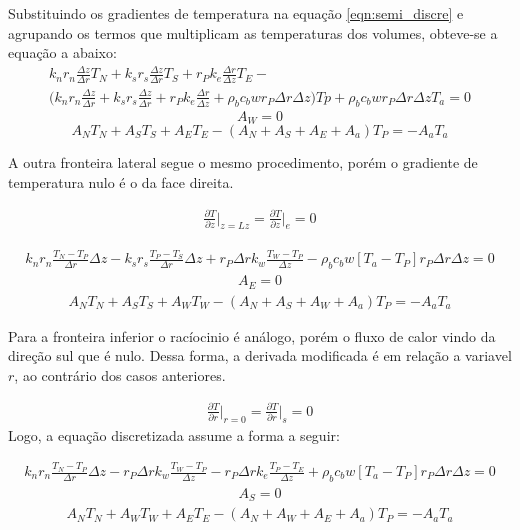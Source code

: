 \documentclass[
	12pt,				%
	openright,			%
	oneside,			%
	a4paper,			%
	english,			%
	french,				%
	spanish,			%
	brazil				%
	]{abntex2}
\begin{document}
Substituindo os gradientes de temperatura na equação \ref{eqn:semi_discre} e agrupando os termos que multiplicam as temperaturas dos volumes, obteve-se a equação a abaixo:
\begin{gather}
k_n r_n \frac{\Delta z}{\Delta r}T_N +
k_s r_s \frac{\Delta z}{\Delta r}T_S +
r_P k_e \frac{\Delta r}{\Delta z}T_E -
\\
\biggr( 
k_n r_n \frac{\Delta z}{\Delta r} +
k_s r_s \frac{\Delta z}{\Delta r} +
r_P k_e \frac{\Delta r}{\Delta z} + 
\rho_b c_b wr_P \Delta r\Delta z
\biggr)Tp +
\rho_b c_b wr_P \Delta r\Delta z T_a = 
0
\end{gather}
\begin{equation}
A_W=0
\end{equation}
\begin{equation}
A_N T_N+A_S T_S+A_E T_E-(A_N+A_S+A_E+A_a)T_P=-A_a T_a
\end{equation}

A outra fronteira lateral segue o mesmo procedimento, porém o gradiente de temperatura nulo é o da face direita. 

\begin{gather}     
\frac{\partial T}{\partial z}\biggr\rvert_{z=Lz}=
\frac{\partial T}{\partial z}\biggr\rvert_{e}=0
\end{gather}

\begin{gather}                                           
k_n r_n \frac{T_N-T_P}{\Delta r}\Delta z -
k_s r_s  \frac{T_P-T_S}{\Delta r}\Delta z +
r_P \Delta r k_w \frac{T_W-T_P}{\Delta z} -
\rho_b c_b w [T_a-T_P]r_P \Delta r\Delta z = 0
\end{gather}
\begin{gather}
A_E=0
\end{gather}
\begin{gather}
A_N T_N+A_S T_S+A_W T_W-(A_N+A_S+A_W+A_a)T_P=-A_a T_a
\end{gather} 

Para a fronteira inferior o racíocinio é análogo, porém o fluxo de calor vindo da direção sul que é nulo. Dessa forma, a derivada modificada é em relação a variavel $r$, ao contrário dos casos anteriores. 

\begin{gather}     
\frac{\partial T}{\partial r}\biggr\rvert_{r=0}=
\frac{\partial T}{\partial r}\biggr\rvert_{s}=0
\end{gather}
Logo, a equação discretizada assume a forma a seguir:

\begin{gather}                                           
k_n r_n \frac{T_N-T_P}{\Delta r}\Delta z -
r_P \Delta r k_w \frac{T_W-T_P}{\Delta z} -
r_P \Delta r k_e \frac{T_P-T_E}{\Delta z}+
\rho_b c_b w [T_a-T_P]r_P \Delta r\Delta z = 0
\end{gather}
\begin{gather}
A_S=0
\end{gather}
\begin{gather}
A_N T_N+A_W T_W+A_E T_E-(A_N+A_W+A_E+A_a)T_P=-A_a T_a
\end{gather} 
\end{document}
